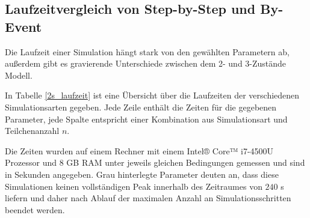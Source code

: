 \subsection{Laufzeitvergleich von Step-by-Step und By-Event}
\label{chapter:imp_laufzeit_sim}
Die Laufzeit einer Simulation hängt stark von den gewählten Parametern ab, außerdem gibt es gravierende Unterschiede zwischen dem 2- und 3-Zustände Modell.

In Tabelle \ref{2s_laufzeit} ist eine Übersicht über die Laufzeiten der verschiedenen Simulationsarten gegeben. 
Jede Zeile enthält die Zeiten für die gegebenen Parameter, jede Spalte entspricht einer Kombination aus Simulationsart und Teilchenanzahl $n$.

Die Zeiten wurden auf einem Rechner mit einem Intel® Core™ i7-4500U Prozessor und $8$ GB RAM 
unter jeweils gleichen Bedingungen gemessen und sind in Sekunden angegeben. %
Grau hinterlegte Parameter deuten an, dass diese Simulationen keinen vollständigen Peak innerhalb des Zeitraumes von $240$ s liefern und daher nach Ablauf der maximalen Anzahl an Simulationsschritten beendet werden.


